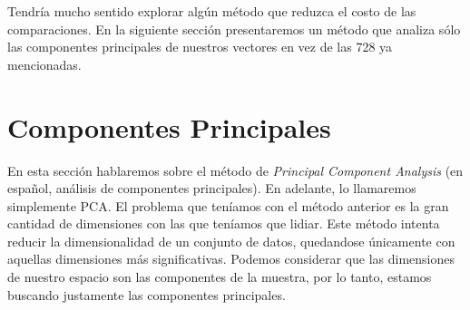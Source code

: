 Tendría mucho sentido explorar algún método que reduzca el costo de las comparaciones. En la siguiente sección presentaremos un método que analiza sólo las componentes principales de nuestros vectores en vez de las 728 ya mencionadas. \\


\newpage
\section{Componentes Principales}

En esta sección hablaremos sobre el método de \textit{Principal Component Analysis} (en español, análisis de componentes principales). En adelante, lo llamaremos simplemente PCA. El problema que teníamos con el método anterior es la gran cantidad de dimensiones con las que teníamos que lidiar. Este método intenta reducir la dimensionalidad de un conjunto de datos, quedandose únicamente con aquellas dimensiones más significativas. Podemos considerar que las dimensiones de nuestro espacio son las componentes de la muestra, por lo tanto, estamos buscando justamente las componentes principales. \\


